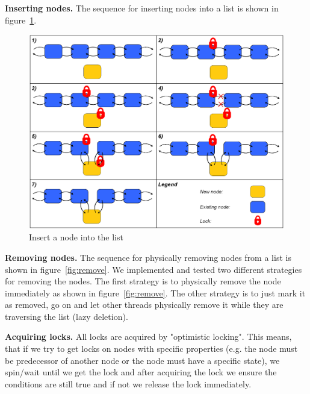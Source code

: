 \documentclass[letterpaper]{article}
\newcommand{\mypar}[1]{{\bf #1.}}
\begin{document}
\mypar{Inserting nodes}
The sequence for inserting nodes into a list is shown in figure~\ref{fig:insert}.

\begin{figure}[h]\centering
  \includegraphics[scale=0.31]{insert.eps}
  \caption{Insert a node into the list \label{fig:insert}}
\end{figure}

\mypar{Removing nodes}
The sequence for physically removing nodes from a list is shown in  figure~\ref{fig:remove}. We implemented and tested two different strategies for removing the nodes. The first strategy is to physically remove the node immediately as shown in figure~\ref{fig:remove}. The other strategy is to just mark it as removed, go on and let other threads physically remove it while they are traversing the list (lazy deletion).

\mypar{Acquiring locks}
All locks are acquired by "optimistic locking". This means, that if we try to get locks on nodes with specific properties (e.g. the node must be predecessor of another node or the node must have a specific state), we spin/wait until we get the lock and after acquiring the lock we ensure the conditions are still true and if not we release the lock immediately.
\end{document}
